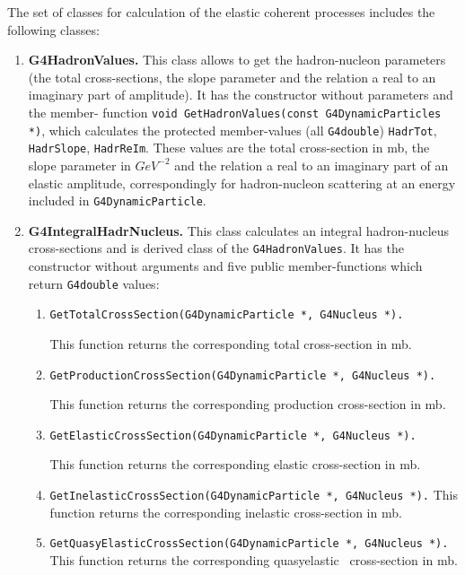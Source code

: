 \documentclass[12pt]{article}
\begin{document}
The set of classes for calculation of the elastic coherent processes includes 
the following classes:

\begin{enumerate}

\item {\bf G4HadronValues.} This class allows to get 
the hadron-nucleon 
parameters (the total cross-sections, the slope parameter and 
the relation a real to an imaginary 
part of amplitude). It has the constructor without parameters and the member-
function {\tt void GetHadronValues(const G4DynamicParticles *)}, 
which calculates  
the protected  member-values (all {\tt G4double}) 
{\tt HadrTot},  {\tt HadrSlope},  {\tt HadrReIm}. 
These values are the total cross-section in mb, the slope parameter in   
$GeV^{-2}$ and 
the relation a real to an imaginary part of an elastic amplitude, 
correspondingly for 
hadron-nucleon scattering at an energy included in 
{\tt G4DynamicParticle}.

\item   {\bf G4IntegralHadrNucleus.} This class calculates an integral
hadron-nucleus cross-sections 
and is derived class of the {\tt G4HadronValues}. 
It  has  the constructor
without arguments and five public member-functions 
which return {\tt G4double} values:

\begin{enumerate}
 \item {\tt GetTotalCrossSection(G4DynamicParticle *, G4Nucleus *).}
 
This function returns the corresponding total cross-section in mb.

 \item {\tt GetProductionCrossSection(G4DynamicParticle *, G4Nucle\-us
*).} 

This function returns the corresponding production cross-section in mb.

 \item {\tt GetElasticCrossSection(G4DynamicParticle *, G4Nucleus *).} 

This 
function returns the corresponding elastic cross-section in mb.

 \item {\tt GetInelasticCrossSection(G4DynamicParticle *, G4Nucleus *).} 
This 
function returns the corresponding inelastic cross-section in mb.

 \item {\tt GetQuasyElasticCrossSection(G4DynamicParticle *, 
G4Nu\-cle\-us *).} 
This function returns the corresponding quasyelastic \
cross-section in mb.


\end{enumerate}
\end{enumerate}
\end{document}
